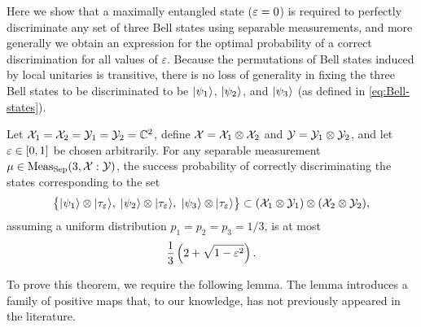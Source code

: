 Here we show that a maximally entangled state ($\varepsilon = 0$) is required to 
perfectly discriminate any set of three Bell states using separable
measurements, and more generally we obtain an expression for the optimal
probability of a correct discrimination for all values of $\varepsilon$.
Because the permutations of Bell states induced by local unitaries is
transitive, there is no loss of generality in fixing the three Bell states to
be discriminated to be $\lvert\mspace{0.5mu} \psi_1 \mspace{0.5mu} \rangle$, $\lvert\mspace{0.5mu} \psi_2 \mspace{0.5mu} \rangle$, and $\lvert\mspace{0.5mu} \psi_3 \mspace{0.5mu} \rangle$
(as defined in \eqref{eq:Bell-states}).

\begin{theorem}
  \label{thm:three-bell}
  Let $\mathcal{X}_1 = \mathcal{X}_2 = \mathcal{Y}_1 = \mathcal{Y}_2 = \mathbb{C}^2$, define 
  $\mathcal{X} = \mathcal{X}_1 \otimes \mathcal{X}_2$ and $\mathcal{Y} = \mathcal{Y}_1 \otimes \mathcal{Y}_2$, and let 
  $\varepsilon \in [0,1]$ be chosen arbitrarily. 
  For any separable measurement $\mu\in\mathrm{Meas}_{\mathrm{Sep}}(3,\mathcal{X}:\mathcal{Y})$, the
  success probability of correctly discriminating the states corresponding to
  the set
  \begin{equation}
    \label{eq:set-three-bells}
    \bigl\{ \lvert\mspace{0.5mu} \psi_{1} \mspace{0.5mu} \rangle \otimes \lvert\mspace{0.5mu} \tau_{\varepsilon} \mspace{0.5mu} \rangle,\; 
    \lvert\mspace{0.5mu} \psi_{2} \mspace{0.5mu} \rangle \otimes \lvert\mspace{0.5mu} \tau_{\varepsilon} \mspace{0.5mu} \rangle,\;
    \lvert\mspace{0.5mu} \psi_{3} \mspace{0.5mu} \rangle \otimes \lvert\mspace{0.5mu} \tau_{\varepsilon} \mspace{0.5mu} \rangle \bigr\}
    \subset (\mathcal{X}_1\otimes\mathcal{Y}_1)\otimes(\mathcal{X}_2\otimes\mathcal{Y}_2),
  \end{equation}
  assuming a uniform distribution $p_1 = p_2 = p_3 = 1/3$, is at most
  \begin{equation}
  \label{eq:probability-three-bell}
    \frac{1}{3}\left(2 + \sqrt{1 - \varepsilon^{2}}\right).
  \end{equation}
\end{theorem}

To prove this theorem, we require the following lemma.
The lemma introduces a family of positive maps that, to our knowledge, has not
previously appeared in the literature.

